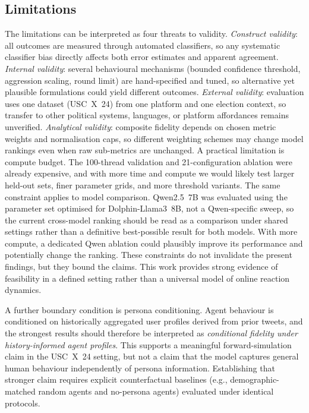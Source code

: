 \documentclass[logo,bsc,singlespacing,parskip,online]{infthesis}
\begin{document}
\subsection{Limitations}

The limitations can be interpreted as four threats to validity. \textit{Construct validity}: all outcomes are measured through automated classifiers, so any systematic classifier bias directly affects both error estimates and apparent agreement. \textit{Internal validity}: several behavioural mechanisms (bounded confidence threshold, aggression scaling, round limit) are hand-specified and tuned, so alternative yet plausible formulations could yield different outcomes. \textit{External validity}: evaluation uses one dataset (USC~X~24) from one platform and one election context, so transfer to other political systems, languages, or platform affordances remains unverified. \textit{Analytical validity}: composite fidelity depends on chosen metric weights and normalisation caps, so different weighting schemes may change model rankings even when raw sub-metrics are unchanged. A practical limitation is compute budget. The 100-thread validation and 21-configuration ablation were already expensive, and with more time and compute we would likely test larger held-out sets, finer parameter grids, and more threshold variants. The same constraint applies to model comparison. Qwen2.5~7B was evaluated using the parameter set optimised for Dolphin-Llama3~8B, not a Qwen-specific sweep, so the current cross-model ranking should be read as a comparison under shared settings rather than a definitive best-possible result for both models. With more compute, a dedicated Qwen ablation could plausibly improve its performance and potentially change the ranking. These constraints do not invalidate the present findings, but they bound the claims. This work provides strong evidence of feasibility in a defined setting rather than a universal model of online reaction dynamics.

A further boundary condition is persona conditioning. Agent behaviour is conditioned on historically aggregated user profiles derived from prior tweets, and the strongest results should therefore be interpreted as \emph{conditional fidelity under history-informed agent profiles}. This supports a meaningful forward-simulation claim in the USC~X~24 setting, but not a claim that the model captures general human behaviour independently of persona information. Establishing that stronger claim requires explicit counterfactual baselines (e.g., demographic-matched random agents and no-persona agents) evaluated under identical protocols.
\end{document}
